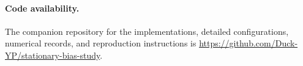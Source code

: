 \paragraph{Code availability.}
The companion repository for the implementations, detailed configurations,
numerical records, and reproduction instructions is
\url{https://github.com/Duck-YP/stationary-bias-study}.

